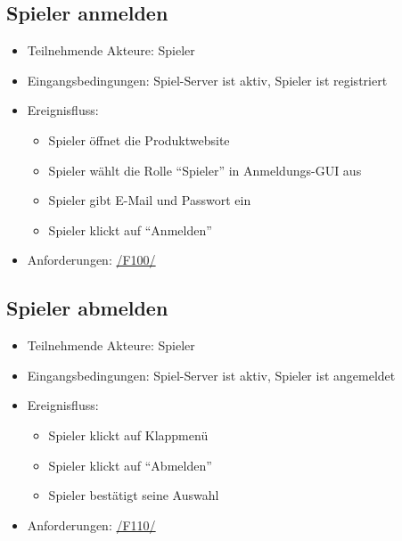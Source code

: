 \documentclass[a4paper]{scrreprt}
\begin{document}
    \subsection{Spieler anmelden}
    \begin{itemize}
        \item Teilnehmende Akteure: \Gls{Spieler}

        \item Eingangsbedingungen: \Gls{Spiel-Server} ist aktiv, \Gls{Spieler} ist registriert

        \item Ereignisfluss:
        \begin{itemize}
            \item \Gls{Spieler} öffnet die Produktwebsite
            \item \Gls{Spieler} wählt die Rolle \enquote{\Gls{Spieler}} in Anmeldungs-GUI aus
            \item \Gls{Spieler} gibt E-Mail und Passwort ein
            \item \Gls{Spieler} klickt auf \enquote{Anmelden}
        \end{itemize}
        \item Anforderungen: \hyperlink{F100}{/F100/}
    \end{itemize}

    \subsection{Spieler abmelden}
    \begin{itemize}
        \item Teilnehmende Akteure: \Gls{Spieler}
        \item Eingangsbedingungen: \Gls{Spiel-Server} ist aktiv, \Gls{Spieler} ist angemeldet
        \item Ereignisfluss:
        \begin{itemize}
            \item \Gls{Spieler} klickt auf Klappmenü
            \item \Gls{Spieler} klickt auf \enquote{Abmelden}
            \item \Gls{Spieler} bestätigt seine Auswahl
        \end{itemize}
        \item Anforderungen: \hyperlink{F110}{/F110/}
    \end{itemize}
\end{document}
